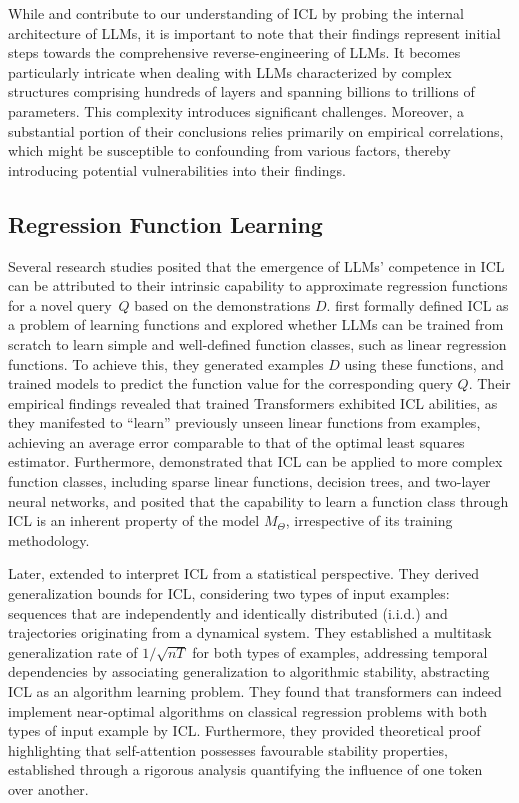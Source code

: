 While \citet{elhage2021mathematical} and \citet{Olsson2022IncontextLA} contribute to our understanding of ICL by probing the internal architecture of LLMs, it is important to note that their findings represent initial steps towards the comprehensive reverse-engineering of LLMs. It becomes particularly intricate when dealing with LLMs characterized by complex structures comprising hundreds of layers and spanning billions to trillions of parameters. This complexity introduces significant challenges. %
Moreover, a substantial portion of their conclusions relies primarily on empirical correlations, which might be susceptible to confounding from various factors, thereby introducing potential vulnerabilities into their findings.

\subsection{Regression Function Learning}
Several research studies posited that the emergence of LLMs' competence in ICL can be attributed to their intrinsic capability to approximate regression functions for a novel query~$Q$ based on the demonstrations $D$.
\citet{Garg2022WhatCT} first formally defined ICL as a problem of learning functions and explored whether LLMs can be trained from scratch to learn simple and well-defined function classes, such as linear regression functions.
To achieve this, they generated examples $D$ using these functions, and trained models to predict the function value for the corresponding query $Q$.
Their empirical findings revealed that trained Transformers exhibited ICL abilities, as they manifested to ``learn'' previously unseen linear functions from examples, achieving an average error comparable to that of the optimal least squares estimator.
Furthermore, \citet{Garg2022WhatCT} demonstrated that ICL can be applied to more complex function classes, including sparse linear functions, decision trees, and two-layer neural networks, and posited that the capability to learn a function class through ICL is an inherent property of the model $M_\Theta$, irrespective of its training methodology.

Later, \citet{Li2023TransformersAA} extended \citet{Garg2022WhatCT} to interpret ICL from a statistical perspective. They derived generalization bounds for ICL, considering two types of input examples: sequences that are independently and identically distributed (i.i.d.) and trajectories originating from a dynamical system.
They established a multitask generalization rate of $1 / \sqrt{n T}$ for both types of examples, addressing temporal dependencies by associating generalization to algorithmic stability, abstracting ICL as an algorithm learning problem. 
They found that transformers can indeed implement near-optimal algorithms on classical regression problems with both types of input example by ICL.
Furthermore, they provided theoretical proof highlighting that self-attention possesses favourable stability properties, established through a rigorous analysis quantifying the influence of one token over another.

